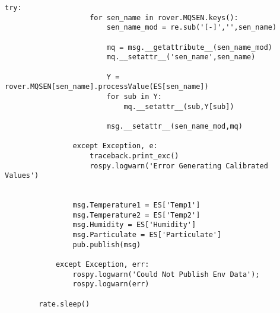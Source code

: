 \begin{lstlisting}[breaklines=true,basicstyle=\tiny]
                try:
                    for sen_name in rover.MQSEN.keys():
                        sen_name_mod = re.sub('[-]','',sen_name)

                        mq = msg.__getattribute__(sen_name_mod)
                        mq.__setattr__('sen_name',sen_name)

                        Y = rover.MQSEN[sen_name].processValue(ES[sen_name])
                        for sub in Y:
                            mq.__setattr__(sub,Y[sub])

                        msg.__setattr__(sen_name_mod,mq)

                except Exception, e:
                    traceback.print_exc()
                    rospy.logwarn('Error Generating Calibrated Values')
                    

                msg.Temperature1 = ES['Temp1']
                msg.Temperature2 = ES['Temp2']
                msg.Humidity = ES['Humidity']
                msg.Particulate = ES['Particulate']
                pub.publish(msg)

            except Exception, err:
                rospy.logwarn('Could Not Publish Env Data');
                rospy.logwarn(err)

        rate.sleep()
\end{lstlisting}


